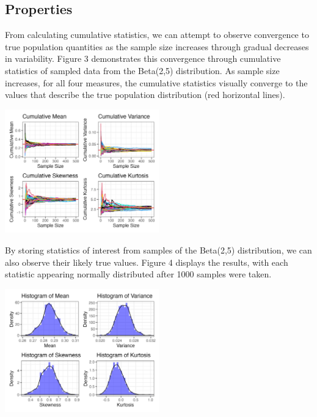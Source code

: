 \documentclass{article}\usepackage[]{graphicx}\usepackage[]{xcolor}
\newenvironment{Figure}
  {\par\medskip\noindent\minipage{\linewidth}}
  {\endminipage\par\medskip}
\begin{document}
\begin{multicols}{2}
\section{Properties}

From calculating cumulative statistics, we can attempt to observe convergence to true population quantities as the sample size increases through gradual decreases in variability. Figure 3 demonstrates this convergence through cumulative statistics of sampled data from the Beta(2,5) distribution. As sample size increases, for all four measures, the cumulative statistics visually converge to the values that describe the true population distribution (red horizontal lines).

\begin{Figure}
\begin{center}
  \includegraphics[width=0.5\textwidth]{task4.png}
\end{center} 
\end{Figure}

By storing statistics of interest from samples of the Beta(2,5) distribution, we can also observe their likely true values. Figure 4 displays the results, with each statistic appearing normally distributed after 1000 samples were taken.

\begin{Figure}
\begin{center}
  \includegraphics[width=0.5\textwidth]{task5.png}
\end{center} 
\end{Figure}


\end{multicols}
\end{document}
